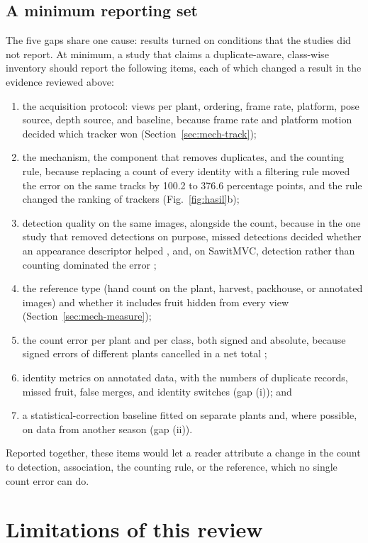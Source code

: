 \subsection{A minimum reporting set}
The five gaps share one cause: results turned on conditions that the studies did not report. At minimum, a study that claims a duplicate-aware, class-wise inventory should report the following items, each of which changed a result in the evidence reviewed above:
\begin{enumerate}[label=(\alph*),leftmargin=*]
\item the acquisition protocol: views per plant, ordering, frame rate, platform, pose source, depth source, and baseline, because frame rate and platform motion decided which tracker won (Section~\ref{sec:mech-track});
\item the mechanism, the component that removes duplicates, and the counting rule, because replacing a count of every identity with a filtering rule moved the error on the same tracks by 100.2 to 376.6 percentage points, and the rule changed the ranking of trackers (Fig.~\ref{fig:hasil}b);
\item detection quality on the same images, alongside the count, because in the one study that removed detections on purpose, missed detections decided whether an appearance descriptor helped \citep{villacres2023apple}, and, on SawitMVC, detection rather than counting dominated the error \citep{indriani2026sawitmvc};
\item the reference type (hand count on the plant, harvest, packhouse, or annotated images) and whether it includes fruit hidden from every view (Section~\ref{sec:mech-measure});
\item the count error per plant and per class, both signed and absolute, because signed errors of different plants cancelled in a net total \citep{rapadorincon2023development};
\item identity metrics on annotated data, with the numbers of duplicate records, missed fruit, false merges, and identity switches (gap (i)); and
\item a statistical-correction baseline fitted on separate plants and, where possible, on data from another season (gap (ii)).
\end{enumerate}
Reported together, these items would let a reader attribute a change in the count to detection, association, the counting rule, or the reference, which no single count error can do.

\section{Limitations of this review}\label{sec:limits}


